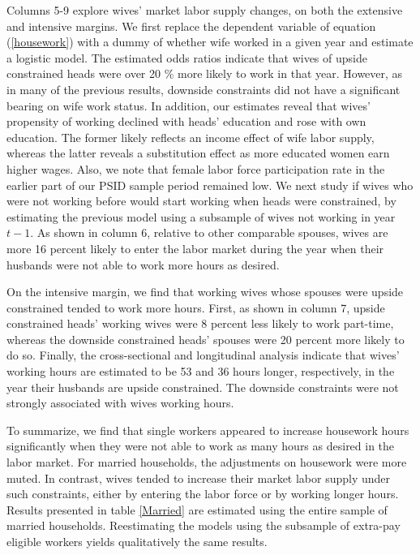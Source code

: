Columns 5-9 explore wives' market labor supply changes, on both the extensive and intensive margins. We first replace the dependent variable of equation (\ref{housework}) with a dummy of whether wife worked in a given year and estimate a logistic model. The estimated odds ratios indicate that wives of upside constrained heads were over 20 \% more likely to work in that year. However, as in many of the previous results, downside constraints did not have a significant bearing on wife work status. In addition, our estimates reveal that wives' propensity of working declined with heads' education and rose with own education. The former likely reflects an income effect of wife labor supply, whereas the latter reveals a substitution effect as more educated women earn higher wages. Also, we note that female labor force participation rate in the earlier part of our PSID sample period remained low. We next study if wives who were not working before would start working when heads were constrained, by estimating the previous model using a subsample of wives not working in year $t-1$.  As shown in column 6, relative to other comparable spouses, wives are more 16 percent likely to enter the labor market during the year when their husbands were not able to work more hours as desired.

On the intensive margin, we find that working wives whose spouses were upside constrained tended to work more hours.  First, as shown in column 7, upside constrained heads' working wives were 8 percent less likely to work part-time, whereas the downside constrained heads' spouses were 20 percent more likely to do so.  Finally, the cross-sectional and longitudinal analysis indicate that wives' working hours are estimated to be 53 and 36 hours longer, respectively, in the year their husbands are upside constrained. The downside constraints were not strongly associated with wives working hours.

To summarize, we find that single workers appeared to increase housework hours significantly when they were not able to work as many hours as desired in the labor market.  For married households, the adjustments on housework were more muted. In contrast, wives tended to increase their market labor supply under such constraints, either by entering the labor force or by working longer hours. Results presented in table \ref{Married} are estimated using the entire sample of married households. Reestimating the models using the subsample of extra-pay eligible workers yields qualitatively the same results.

